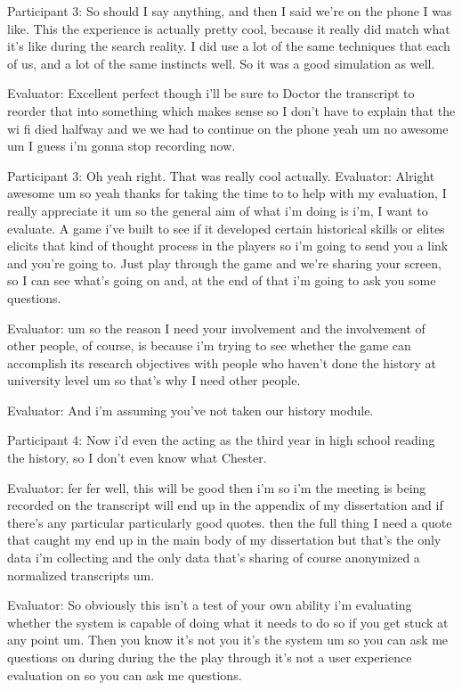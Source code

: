 \documentclass{l4proj}
\begin{document}
\begin{appendices}
Participant 3: So should I say anything, and then I said we're on the phone I was like. This the experience is actually pretty cool, because it really did match what it's like during the search reality. I did use a lot of the same techniques that each of us, and a lot of the same instincts well. So it was a good simulation as well.

Evaluator: Excellent perfect though i'll be sure to Doctor the transcript to reorder that into something which makes sense so I don’t have to explain that the wi fi died halfway and we we had to continue on the phone yeah um no awesome um I guess i'm gonna stop recording now.

Participant 3: Oh yeah right. That was really cool actually.
Evaluator: Alright awesome um so yeah thanks for taking the time to to help with my evaluation, I really appreciate it um so the general aim of what i'm doing is i'm, I want to evaluate. A game i've built to see if it developed certain historical skills or elites elicits that kind of thought process in the players so i'm going to send you a link and you're going to. Just play through the game and we're sharing your screen, so I can see what's going on and, at the end of that i'm going to ask you some questions.

Evaluator: um so the reason I need your involvement and the involvement of other people, of course, is because i'm trying to see whether the game can accomplish its research objectives with people who haven't done the history at university level um so that's why I need other people.

Evaluator: And i'm assuming you've not taken our history module.

Participant 4: Now i'd even the acting as the third year in high school reading the history, so I don't even know what Chester.

Evaluator: fer fer well, this will be good then i'm so i'm the meeting is being recorded on the transcript will end up in the appendix of my dissertation and if there's any particular particularly good quotes. then the full thing I need a quote that caught my end up in the main body of my dissertation but that's the only data i'm collecting and the only data that's sharing of course anonymized a normalized transcripts um.

Evaluator: So obviously this isn't a test of your own ability i'm evaluating whether the system is capable of doing what it needs to do so if you get stuck at any point um. Then you know it's not you it's the system um so you can ask me questions on during during the the play through it's not a user experience evaluation on so you can ask me questions.


\end{appendices}
\end{document}
